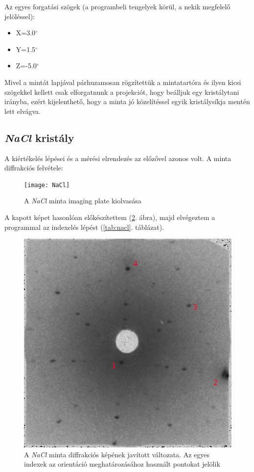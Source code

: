 \documentclass[12pt,a4paper]{article}
\begin{document}
\newline
Az egyes forgatási szögek (a programbeli tengelyek körül, a nekik megfelelő jelöléssel):\\
\begin{itemize}
\item{X=3.0$^{\circ}$}
\item{Y=1.5$^{\circ}$}
\item{Z=-5.0$^{\circ}$}
\end{itemize}

Mivel a mintát lapjával párhuzamosan rögzítettük a mintatartóra és ilyen kicsi szögekkel kellett csak elforgatnunk a projekciót, hogy beálljuk egy kristálytani irányba, ezért kijelenthető, hogy a minta jó közelítéssel egyik kristálysíkja mentén lett elvágva.

\subsection{\emph{NaCl} kristály}
\hspace*{10pt} A kiértékelés lépései és a mérési elrendezés az előzővel azonos volt. A minta diffrakciós felvétele:\\
\begin{figure}[!h]
\centering
\texttt{[image: NaCl]}
\caption{A \emph{NaCl} minta imaging plate kiolvasása}
\label{nacl:unproc}
\end{figure}
\newline
A kapott képet hasonlóan előkészítettem (\ref{fig:nacl_proc}. ábra), majd elvégeztem a programmal az indexelés lépést (\ref{tab:nacl}. táblázat). \\

\begin{figure}[!h]
\centering
\includegraphics[scale=1.8]{nacl_proc}
\caption{A \emph{NaCl} minta diffrakciós képének javított változata. Az egyes indexek az orientáció meghatározásához használt pontokat jelölik}
\label{fig:nacl_proc}
\end{figure}
\end{document}
